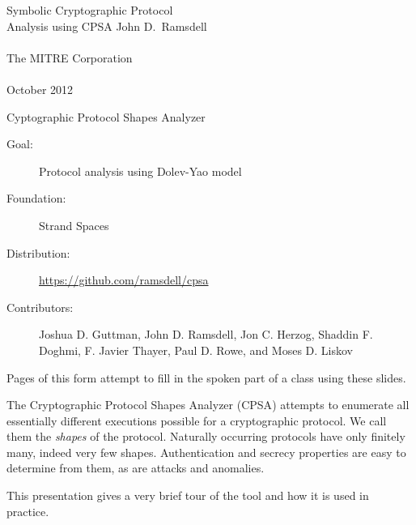 \documentclass[landscape]{slides}
\newcommand{\cpsa}{CPSA}
\begin{document}
\begin{titleslide}{Symbolic Cryptographic Protocol \\ Analysis using CPSA}
%
John D.~Ramsdell\\
~\\
The MITRE Corporation\\
~\\
October 2012
\end{titleslide}

\begin{mitreslide}{Cyptographic Protocol Shapes Analyzer}
\begin{description}
\item [Goal:] Protocol analysis using Dolev-Yao model
\item [Foundation:] Strand Spaces
\item [Distribution:] \url{https://github.com/ramsdell/cpsa}
\item [Contributors:]
  Joshua D. Guttman, John D. Ramsdell, Jon C. Herzog, Shaddin
  F. Doghmi, F. Javier Thayer, Paul D. Rowe, and Moses D. Liskov
\end{description}
\end{mitreslide}

\begin{note}
  Pages of this form attempt to fill in the spoken part of a
  class using these slides.

  The Cryptographic Protocol Shapes Analyzer ({\cpsa}) attempts to
  enumerate all essentially different executions possible for a
  cryptographic protocol. We call them the \emph{shapes} of the
  protocol. Naturally occurring protocols have only finitely many,
  indeed very few shapes. Authentication and secrecy properties are
  easy to determine from them, as are attacks and anomalies.

  This presentation gives a very brief tour of the tool and how it is
  used in practice.
\end{note}
\end{document}
